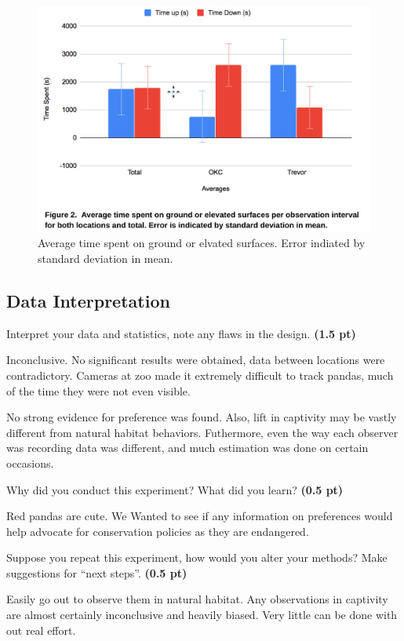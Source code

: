 \documentclass[12pt,a4paper]{article}
\begin{document}
\begin{enumerate}[font=\bfseries, wide, resume]
\begin{figure}[ht]
        \centering
        \includegraphics[scale=0.38]{images/fig-9-2.png}
        \caption{Average time spent on ground or elvated surfaces. Error indiated by standard deviation in mean.}
    \end{figure}
\end{enumerate}   
\newpage
\subsection*{Data Interpretation}    
\begin{enumerate}[font=\bfseries, wide, resume]

    {\color{under}\item Interpret your data and statistics, note any flaws in the design. \textbf{(1.5 pt)}}

    Inconclusive. No significant results were obtained, data between locations were contradictory. Cameras at zoo made it extremely difficult to track pandas, much of the time they were not even visible. 
    
    No strong evidence for preference was found. Also, lift in captivity may be vastly different from natural habitat behaviors. Futhermore, even the way each observer was recording data was different, and much estimation was done on certain occasions.

    {\color{under}\item Why did you conduct this experiment? What did you learn? \textbf{(0.5 pt)}}

    Red pandas are cute. We Wanted to see if any information on preferences would help advocate for conservation policies as they are endangered.

    {\color{under}\item Suppose you repeat this experiment, how would you alter your methods? Make suggestions for “next steps”. \textbf{(0.5 pt)}}

    Easily go out to observe them in natural habitat. Any observations in captivity are almost certainly inconclusive and heavily biased. Very little can be done with out real effort.
\end{enumerate}
\end{document}
